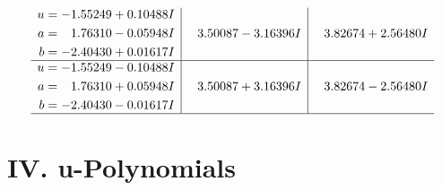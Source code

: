 \documentclass[1p]{elsarticle_modified}
\theoremstyle{definition}
\begin{document}
$$\begin{array}{c|c|c}
\begin{aligned}
u &= -1.55249 + 0.10488 I \\
a &= \phantom{-}1.76310 - 0.05948 I \\
b &= -2.40430 + 0.01617 I\end{aligned}
 & \phantom{-}3.50087 - 3.16396 I & \phantom{-}3.82674 + 2.56480 I \\ \hline\begin{aligned}
u &= -1.55249 - 0.10488 I \\
a &= \phantom{-}1.76310 + 0.05948 I \\
b &= -2.40430 - 0.01617 I\end{aligned}
 & \phantom{-}3.50087 + 3.16396 I & \phantom{-}3.82674 - 2.56480 I\\
 \hline 
 \end{array}$$\newpage
\newpage\renewcommand{\arraystretch}{1}
\centering \section*{ IV. u-Polynomials}
\end{document}
